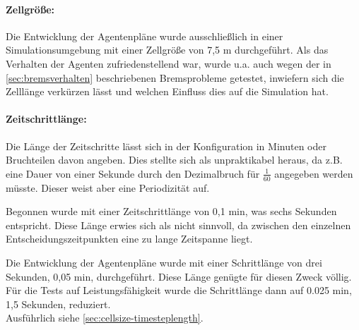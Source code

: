 
\paragraph*{Zellgröße:}
\label{zellgroesse-zeitschritte}
Die Entwicklung der Agentenpläne wurde ausschließlich in einer Simulationsumgebung mit einer Zellgröße von 7,5 m durchgeführt.
Als das Verhalten der Agenten zufriedenstellend war, wurde u.a. auch wegen der in \cref{sec:bremsverhalten} beschriebenen Bremsprobleme getestet, inwiefern sich die Zelllänge verkürzen lässt und welchen Einfluss dies auf die Simulation hat.


\paragraph*{Zeitschrittlänge:}
Die Länge der Zeitschritte lässt sich in der Konfiguration in Minuten oder Bruchteilen davon angeben. 
Dies stellte sich als unpraktikabel heraus, da z.B. eine Dauer von einer Sekunde durch den Dezimalbruch für $\frac{1}{60}$ angegeben werden müsste. Dieser weist aber eine Periodizität auf.

Begonnen wurde mit einer Zeitschrittlänge von 0,1 min, was sechs Sekunden entspricht. 
Diese Länge erwies sich als nicht sinnvoll, da zwischen den einzelnen Entscheidungszeitpunkten eine zu lange Zeitspanne liegt.

Die Entwicklung der Agentenpläne wurde mit einer Schrittlänge von drei Sekunden, 0,05 min, durchgeführt. Diese Länge genügte für diesen Zweck völlig.
Für die Tests auf Leistungsfähigkeit wurde die Schrittlänge dann auf 0.025 min, 1,5 Sekunden, reduziert.
\\
Ausführlich siehe \cref{sec:cellsize-timesteplength}.


